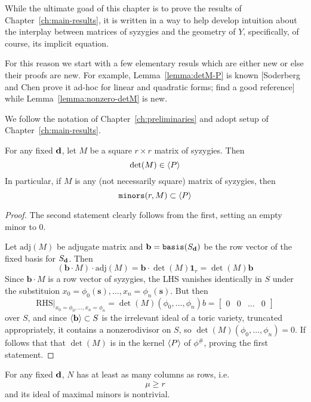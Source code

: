 \documentclass[fleqn,reqno]{amsart}
\newcounter{chapter}
\numberwithin{first}{chapter}
\begin{document}



\begin{paragraf*}
While the ultimate goad of this chapter is to prove the results of Chapter~\ref{ch:main-results},
it is written in a way to help develop intuition about the interplay between matrices of syzygies and
the geometry of $Y$, specifically, of course, its implicit equation.

For this reason we start with a few elementary resuls which are either new or else their proofs are new.
For example, Lemma~\ref{lemma:detM-P} is known [Soderberg and Chen prove it ad-hoc for linear and quadratic forms;
find a good reference]
while Lemma~\ref{lemma:nonzero-detM} is new.

We follow the notation of Chapter~\ref{ch:preliminaries} and adopt setup of Chapter~\ref{ch:main-results}.
\end{paragraf*}

\begin{lemma}
\label{lemma:detM-P}
For any fixed $\mathbf d$, let $M$ be a square $r\times r$ matrix of syzygies.
Then
\[
\det(M)\in \langle P\rangle
\]
In particular, if $M$ is any (not necessarily square) matrix of syzygies, then
\[
\mathop{\tt minors}(r,M)\subset\langle P\rangle
\]
\end{lemma}

\begin{proof}
The second statement clearly follows from the first, setting an empty minor to 0.

Let $\text{adj}(M)$ be adjugate matrix and $\mathbf b=\mathop{\tt basis}(S_\mathbf d)$ be the row vector
of the fixed basis for $S_{\mathbf d}$.
Then
\[
(\mathbf b\cdot M)\cdot\text{adj}(M)=\mathbf b\cdot\det(M)\mathbf 1_r=\det(M)\mathbf b
\]
Since $\mathbf b\cdot M$ is a row vector of syzygies, the LHS vanishes identically in $S$ under
the substituion $x_0=\phi_0(\mathbf s),\ldots,x_n=\phi_n(\mathbf s)$.
But then
\[
	\text{RHS}|_{x_0=\phi_0,\ldots,x_n=\phi_n}=\det(M)(\phi_0,\ldots,\phi_n)b=
	\begin{bmatrix}0& 0& \ldots& 0\end{bmatrix}
\]
over $S$, and since $\langle \mathbf b\rangle\subset S$ is the irrelevant ideal of a toric variety,
truncated appropriately, it contains a nonzerodivisor on $S$, so
$\det(M)(\phi_0,\ldots,\phi_n)=0$.
If follows that that $\det(M)$ is in the kernel $\langle P\rangle$ of $\phi^\#$,
proving the first statement.
\end{proof}

\begin{lemma}
\label{lemma:nonzero-detM}
For any fixed $\mathbf d$, $N$ has at least as many columns as rows, i.e.
\[
\mu\geq r
\]
and its ideal of maximal minors is nontrivial.
\end{lemma}
\end{document}
